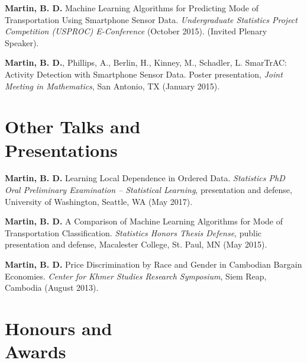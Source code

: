 \documentclass[margin,centered]{res}
\begin{document}
\begin{resume}
\textbf{Martin, B. D.} Machine Learning Algorithms for Predicting Mode of Transportation Using Smartphone Sensor Data. \textit{Undergraduate Statistics Project Competition (USPROC) E-Conference} (October 2015). (Invited Plenary Speaker).

\textbf{Martin, B. D.}, Phillips, A., Berlin, H., Kinney, M., Schadler, L. SmarTrAC: Activity Detection with Smartphone Sensor Data. Poster presentation, \textit{Joint Meeting in Mathematics}, San Antonio, TX (January 2015). 


\section{\sc Other Talks and \\ Presentations}


\textbf{Martin, B. D.} Learning Local Dependence in Ordered Data. \emph{Statistics PhD Oral Preliminary Examination -- Statistical Learning}, presentation and defense, University of Washington, Seattle, WA (May 2017).

\textbf{Martin, B. D.} A Comparison of Machine Learning Algorithms for Mode of Transportation Classification. \emph{Statistics Honors Thesis Defense}, public presentation and defense, Macalester College, St. Paul, MN (May 2015).

\textbf{Martin, B. D.} Price Discrimination by Race and Gender in Cambodian Bargain Economies. \textit{Center for Khmer Studies Research Symposium}, Siem Reap, Cambodia (August 2013).



\section{\sc Honours and\\ Awards}


\end{resume}
\end{document}
